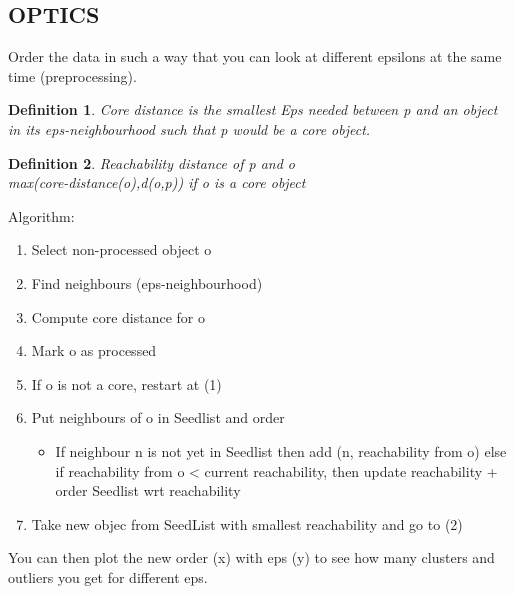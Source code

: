 \documentclass[a4paper]{article}
\newtheorem{definition}{Definition}
\begin{document}
\subsection{OPTICS}
Order the data in such a way that you can look at different epsilons at the same
time (preprocessing).\\
\begin{definition}
	Core distance is the smallest Eps needed between p and an object in its
	eps-neighbourhood such that p would be a core object.
\end{definition}
\begin{definition}
	Reachability distance of p and o\\
	max(core-distance(o),d(o,p)) if o is a core object
\end{definition}
Algorithm:
\begin{enumerate}
	\item Select non-processed object o
	\item Find neighbours (eps-neighbourhood)
	\item Compute core distance for o
	\item Mark o as processed
	\item If o is not a core, restart at (1)
	\item Put neighbours of o in Seedlist and order
		\begin{itemize}
			\item If neighbour n is not yet in Seedlist then add (n,
				reachability from o) else if reachability from o
				< current reachability, then update reachability
				+ order Seedlist wrt reachability
		\end{itemize}
	\item Take new objec from SeedList with smallest reachability and go to
		(2)
\end{enumerate}
You can then plot the new order (x) with eps (y) to see how many clusters and
outliers you get for different eps.
\end{document}
